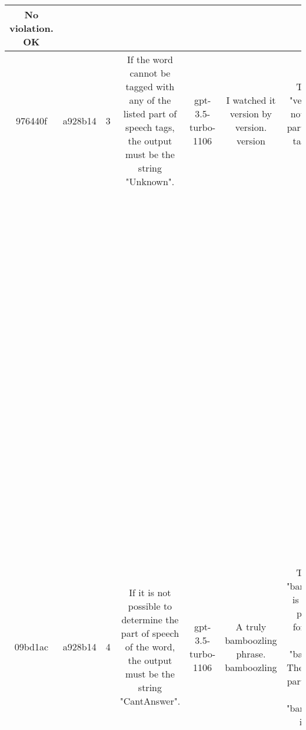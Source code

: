 \begin{table}[h!]
\begin{tabular}{|c|c|c|c|c|c|c|c|c|c|}
No violation.
OK & \\
\hline
976440f & a928b14 & 3 & If the word cannot be tagged with any of the listed part of speech tags, the output must be the string "Unknown". & gpt-3.5-turbo-1106 & I watched it version by version. version & The word "version" is a noun, so the part of speech tag for it is NN. & ok & No violation.
OK & \\
\hline
09bd1ac & a928b14 & 4 & If it is not possible to determine the part of speech of the word, the output must be the string "CantAnswer". & gpt-3.5-turbo-1106 & A truly bamboozling phrase. bamboozling & The word "bamboozling" is a present participle form of the verb "bamboozle". Therefore, the part of speech tag for "bamboozling" is VBG. & ok & The chatbot output appears to comply with the description provided. The output provides a part of speech tag, "VBG", which corresponds to the description's list of tags. The description specifies that the output should return just the tag for the word's part of speech. While the description makes reference to a preference for returning "just the tag," there is no stipulation against providing additional grammatical information leading to that conclusion. So while the output includes an explanation, it ultimately provides the required tag "VBG". Furthermore, since the correctness of tagging cannot be assessed without knowing the specific input, it cannot be considered a violation here.

OK & \\
\hline
38a8ae5 & a928b14 & 4 & If it is not possible to determine the part of speech of the word, the output must be the string "CantAnswer". & gpt-3.5-turbo-1106 & He activated the system. system & Noun & err & The chatbot's output is simply "Noun." According to the description provided, the chatbot is expected to return a specific part of speech tag from the list provided or use "Unknown" or "CantAnswer" if applicable. None of the tags in the list are the word "Noun" itself. Instead, for nouns, it should use the specified tags such as NN, NNS, NNP, or NNPS. Since the output does not conform to this expectation by providing a tag from the list, it does not comply with the description.

ERR & \\
\hline
c3dd43e & a928b14 & 4 & If it is not possible to determine the part of speech of the word, the output must be the string "CantAnswer". & gpt-3.5-turbo-1106 & But then where? then & The part of speech for "then" in this sentence is RB (Adverb). & ok & The chatbot output provides the part of speech tag "RB" for the word "then." According to the given list of tags, "RB" corresponds to an adverb. The output correctly follows the requirement of returning only the part of speech tag for the given word. There is no additional information or any indication of the checks that require knowing the input, so the compliance can only be based on the format and relevance of the tag itself.


\end{tabular}
\end{table}
